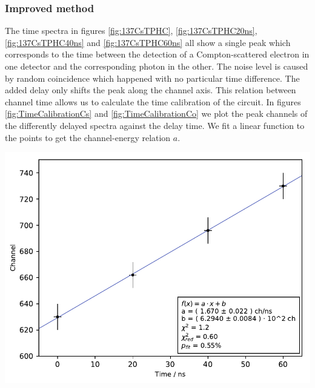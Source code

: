 \subsubsection*{Improved method}
%
The time spectra in figures \ref{fig:137CsTPHC}, \ref{fig:137CsTPHC20ns}, \ref{fig:137CsTPHC40ns} and \ref{fig:137CsTPHC60ns} all show a single peak which corresponds to the time between the detection of a Compton-scattered electron in one detector and the corresponding photon in the other.
The noise level is caused by random coincidence which happened with no particular time difference.
The added delay only shifts the peak along the channel axis.
This relation between channel time allows us to calculate the time calibration of the circuit.
In figures \ref{fig:TimeCalibrationCs} and \ref{fig:TimeCalibrationCo} we plot the peak channels of the differently delayed spectra against the delay time.
We fit a linear function to the points to get the channel-energy relation $a$.
%
\par
%
\minipage{\linewidth}
    \begin{center}
        \captionsetup{type=figure}
        \begin{adjustbox}{max width=\linewidth, keepaspectratio}
            \includegraphics[]{pdf/time_calibration-cs}
        \end{adjustbox}
        \label{fig:TimeCalibrationCs}
    \end{center}
\endminipage
%
\par
%
\minipage{\linewidth}
